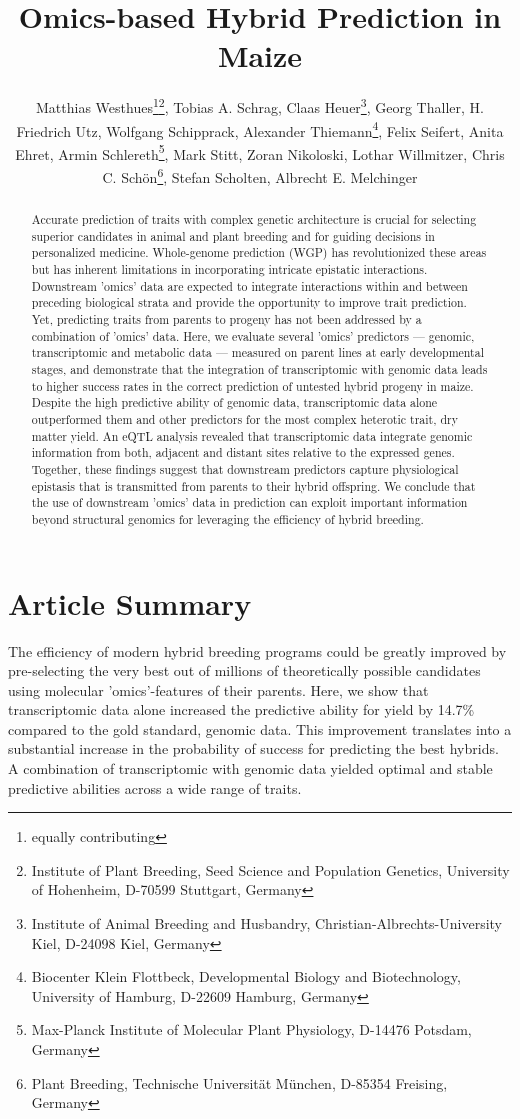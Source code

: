 \documentclass[12pt,titlepage]{article}
\title{Omics-based Hybrid Prediction in Maize}
\author{
  Matthias Westhues\thanks{equally contributing}\thanks{Institute of Plant Breeding, Seed Science and Population Genetics, University of Hohenheim, D-70599 Stuttgart, Germany},
  Tobias A. Schrag\samethanks[1]\samethanks[2],
  Claas Heuer\thanks{Institute of Animal Breeding and Husbandry, Christian-Albrechts-University Kiel, D-24098 Kiel, Germany},
  Georg Thaller\samethanks[3],
  H. Friedrich Utz\samethanks[2],
  Wolfgang Schipprack\samethanks[2],
  Alexander Thiemann\thanks{Biocenter Klein Flottbeck, Developmental Biology and Biotechnology, University of Hamburg, D-22609 Hamburg, Germany},
  Felix Seifert\samethanks,
  Anita Ehret\samethanks[3],
  Armin Schlereth\thanks{Max-Planck Institute of Molecular Plant Physiology,
  D-14476 Potsdam, Germany},
  Mark Stitt\samethanks,
  Zoran Nikoloski\samethanks,
  Lothar Willmitzer\samethanks,
  Chris C. Sch{\"o}n\thanks{Plant Breeding, Technische Universit{\"a}t
  M{\"u}nchen, D-85354 Freising, Germany},
  Stefan Scholten\samethanks[4],
  Albrecht E. Melchinger\samethanks[2]
}
\begin{document}
\maketitle
\doublespacing
\linenumbers



\begin{abstract}
Accurate prediction of traits with complex genetic architecture is crucial for 
selecting superior candidates in animal and plant breeding and for guiding 
decisions in personalized medicine.
Whole-genome prediction (WGP) has revolutionized these areas but has inherent 
limitations in incorporating intricate epistatic interactions.
Downstream 'omics' data are expected to integrate interactions within and 
between preceding biological strata and provide the opportunity to improve trait 
prediction.
Yet, predicting traits from parents to progeny has not been addressed by a 
combination of 'omics' data. 
Here, we evaluate several 'omics' predictors --- genomic, transcriptomic and 
metabolic data --- measured on parent lines at early developmental stages, and 
demonstrate that the integration of transcriptomic with genomic data leads to 
higher success rates in the correct prediction of untested hybrid progeny in 
maize.
Despite the high predictive ability of genomic data, transcriptomic data alone 
outperformed them and other predictors for the most complex heterotic trait, 
dry matter yield.
An eQTL analysis revealed that transcriptomic data integrate genomic information
from both, adjacent and distant sites relative to the expressed genes.
Together, these findings suggest that downstream predictors capture
physiological epistasis that is transmitted from parents to their hybrid
offspring.
We conclude that the use of downstream 'omics' data in prediction can exploit 
important information beyond structural genomics for leveraging the efficiency 
of hybrid breeding.
\end{abstract}



\section{Article Summary}
The efficiency of modern hybrid breeding programs could be greatly improved
by pre-selecting the very best out of millions of theoretically possible
candidates using molecular 'omics'-features of their parents.
Here, we show that transcriptomic data alone increased the predictive ability
for yield by 14.7\% compared to the gold standard, genomic data.
This improvement translates into a substantial increase in the probability of
success for predicting the best hybrids.
A combination of transcriptomic with genomic data yielded optimal and stable
predictive abilities across a wide range of traits.
\end{document}
